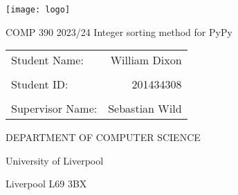 \documentclass[12pt]{article}
\begin{document}
    \begin{center}
      
    
    \texttt{[image: logo]}
    \vspace{2cm}
    \begin{LARGE}
      \linebreak
      COMP 390
      \vspace{.8cm}
      \linebreak
      \vspace{1.5cm}
      2023/24
      \linebreak     
      Integer sorting method for PyPy   
    \end{LARGE}
    \linebreak   
    \vspace{2.5cm}
    \begin{table}[h]
      \begin{large}
        
        \centering
        \begin{tabularx}{.7\linewidth}{Xr}
          
          Student Name: & William Dixon \\
          & \\
          Student ID: & 201434308\\
          & \\
          Supervisor Name: & Sebastian Wild
        \end{tabularx}
        
      \end{large}
      \end{table}
      \vspace{1cm}
      
    \begin{LARGE}
      
      DEPARTMENT OF\linebreak      
      COMPUTER SCIENCE
      \vspace{4.5cm}
      
    \end{LARGE}
    \begin{large}
      
      University of Liverpool
      
      Liverpool L69 3BX
    \end{large}
      
  \end{center}
  \pagebreak
  {
	  \hypersetup{linkcolor=black}
	  \tableofcontents
	  }
	  \newcommand{\myparagraph}[1]{\paragraph{#1}\mbox{}\\}
	  \pagebreak
\end{document}
